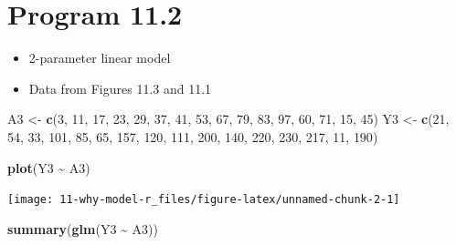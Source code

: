 \documentclass[
  10pt,
]{book}
\newenvironment{Shaded}{\begin{snugshade}}{\end{snugshade}}
\newcommand{\DecValTok}[1]{\textcolor[rgb]{0.00,0.00,0.81}{#1}}
\newcommand{\KeywordTok}[1]{\textcolor[rgb]{0.13,0.29,0.53}{\textbf{#1}}}
\newcommand{\NormalTok}[1]{#1}
\newcommand{\OperatorTok}[1]{\textcolor[rgb]{0.81,0.36,0.00}{\textbf{#1}}}
\newcommand{\StringTok}[1]{\textcolor[rgb]{0.31,0.60,0.02}{#1}}
\providecommand{\tightlist}{%
  \setlength{\itemsep}{0pt}\setlength{\parskip}{0pt}}
\begin{document}
\hypertarget{program-11.2}{%
\section{Program 11.2}\label{program-11.2}}

\begin{itemize}
\tightlist
\item
  2-parameter linear model
\item
  Data from Figures 11.3 and 11.1
\end{itemize}

\begin{Shaded}
\begin{Highlighting}[]
\NormalTok{A3 \textless{}{-}}
\StringTok{  }\KeywordTok{c}\NormalTok{(}\DecValTok{3}\NormalTok{, }\DecValTok{11}\NormalTok{, }\DecValTok{17}\NormalTok{, }\DecValTok{23}\NormalTok{, }\DecValTok{29}\NormalTok{, }\DecValTok{37}\NormalTok{, }\DecValTok{41}\NormalTok{, }\DecValTok{53}\NormalTok{, }\DecValTok{67}\NormalTok{, }\DecValTok{79}\NormalTok{, }\DecValTok{83}\NormalTok{, }\DecValTok{97}\NormalTok{, }\DecValTok{60}\NormalTok{, }\DecValTok{71}\NormalTok{, }\DecValTok{15}\NormalTok{, }\DecValTok{45}\NormalTok{)}
\NormalTok{Y3 \textless{}{-}}
\StringTok{  }\KeywordTok{c}\NormalTok{(}\DecValTok{21}\NormalTok{, }\DecValTok{54}\NormalTok{, }\DecValTok{33}\NormalTok{, }\DecValTok{101}\NormalTok{, }\DecValTok{85}\NormalTok{, }\DecValTok{65}\NormalTok{, }\DecValTok{157}\NormalTok{, }\DecValTok{120}\NormalTok{, }\DecValTok{111}\NormalTok{, }\DecValTok{200}\NormalTok{, }\DecValTok{140}\NormalTok{, }\DecValTok{220}\NormalTok{, }\DecValTok{230}\NormalTok{, }\DecValTok{217}\NormalTok{,}
    \DecValTok{11}\NormalTok{, }\DecValTok{190}\NormalTok{)}

\KeywordTok{plot}\NormalTok{(Y3 }\OperatorTok{\textasciitilde{}}\StringTok{ }\NormalTok{A3)}
\end{Highlighting}
\end{Shaded}

\begin{center}\texttt{[image: 11-why-model-r\_files/figure-latex/unnamed-chunk-2-1]} \end{center}

\begin{Shaded}
\begin{Highlighting}[]
\KeywordTok{summary}\NormalTok{(}\KeywordTok{glm}\NormalTok{(Y3 }\OperatorTok{\textasciitilde{}}\StringTok{ }\NormalTok{A3))}
\end{Highlighting}
\end{Shaded}
\end{document}

